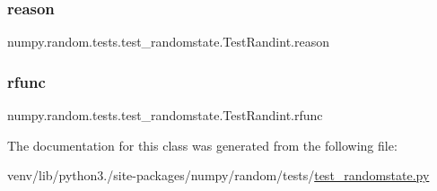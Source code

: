 \subsubsection{\texorpdfstring{reason}{reason}}
{\footnotesize\ttfamily numpy.\+random.\+tests.\+test\+\_\+randomstate.\+Test\+Randint.\+reason\hspace{0.3cm}{\ttfamily [static]}}

\mbox{\label{classnumpy_1_1random_1_1tests_1_1test__randomstate_1_1TestRandint_a8cb037ed82f919577a0fb2c33d89cb8d}} 
\subsubsection{\texorpdfstring{rfunc}{rfunc}}
{\footnotesize\ttfamily numpy.\+random.\+tests.\+test\+\_\+randomstate.\+Test\+Randint.\+rfunc\hspace{0.3cm}{\ttfamily [static]}}



The documentation for this class was generated from the following file\+:\begin{DoxyCompactItemize}
\item 
venv/lib/python3./site-\/packages/numpy/random/tests/\hyperlink{test__randomstate_8py}{test\+\_\+randomstate.\+py}\end{DoxyCompactItemize}
